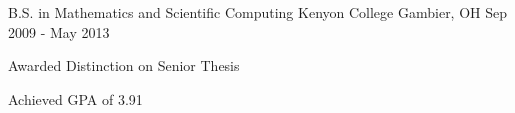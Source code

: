 \begin{cventries}
  \cventry
    {B.S. in Mathematics and Scientific Computing}
    {Kenyon College}
    {Gambier, OH}
    {Sep 2009 - May 2013}
    {
      \begin{cvitems}
        \item {Awarded Distinction on Senior Thesis}
        \item {Achieved GPA of 3.91}
      \end{cvitems}
    }
\end{cventries}
